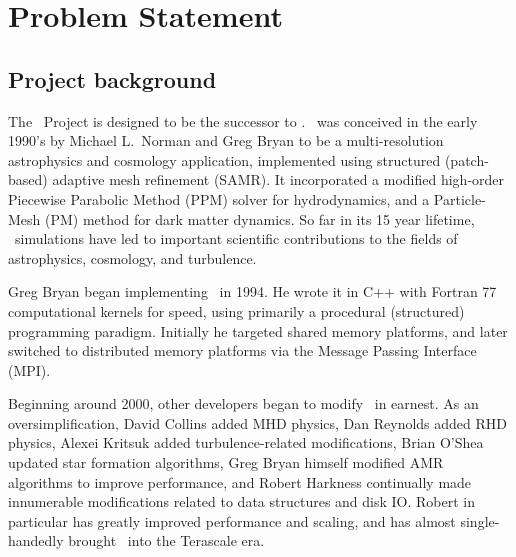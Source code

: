 \documentclass[11pt]{article}
\begin{document}

\section{Problem Statement}

\subsection{Project background}


    The \cello\ Project
  is designed to be the successor to \enzo.  \enzo\ was conceived in
  the early 1990's by Michael L.~Norman and Greg Bryan to be a
  multi-resolution astrophysics and cosmology application, implemented
  using structured (patch-based) adaptive mesh refinement (SAMR).  It
  incorporated a modified high-order Piecewise Parabolic Method (PPM)
  solver for hydrodynamics, and a Particle-Mesh (PM) method for dark
  matter dynamics.  So far in its 15 year lifetime, \enzo\ simulations
  have led to important scientific contributions to the fields of
  astrophysics, cosmology, and turbulence.

    Greg Bryan began implementing \enzo\ in 1994.  He wrote it in C++
    with Fortran 77 computational kernels for speed, using primarily a
    procedural (structured) programming paradigm.  Initially he
    targeted shared memory platforms, and later switched to
    distributed memory platforms via the Message Passing Interface
    (MPI).

    Beginning around 2000, other developers began to modify \enzo\ in
    earnest. As an oversimplification, David Collins added MHD
    physics, Dan Reynolds added RHD physics, Alexei Kritsuk added
    turbulence-related modifications, Brian O'Shea updated star
    formation algorithms, Greg Bryan himself modified AMR algorithms
    to improve performance, and Robert Harkness continually made
    innumerable modifications related to data structures and disk IO.
    Robert in particular has greatly improved performance and scaling,
    and has almost single-handedly brought \enzo\ into the Terascale
    era.
\end{document}
